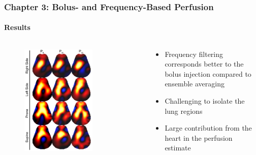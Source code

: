 \documentclass[10pt,    %
    english,            %
    xcolor=table,       %
    envcountsect,        %
    aspectratio=1610
]{beamer}
\begin{document}
\begin{frame}
	\frametitle{Chapter 3: Bolus- and Frequency-Based Perfusion}
	\framesubtitle{Results}
	\begin{columns}[c]
		\begin{column}{0.5\textwidth}
	\begin{figure}
		\centering
	\includegraphics[width=0.7\textwidth,trim={0 0 0 0cm},clip]{imgs/fig-discussionSample.pdf}
	\end{figure}
\end{column}
\begin{column}{0.5\textwidth}
	\begin{itemize}
		\item Frequency filtering corresponds better to the bolus injection compared to ensemble averaging
		\item Challenging to isolate the lung regions
		\item Large contribution from the heart in the perfusion estimate
	\end{itemize}
\end{column}
\end{columns}
\end{frame}
\end{document}
